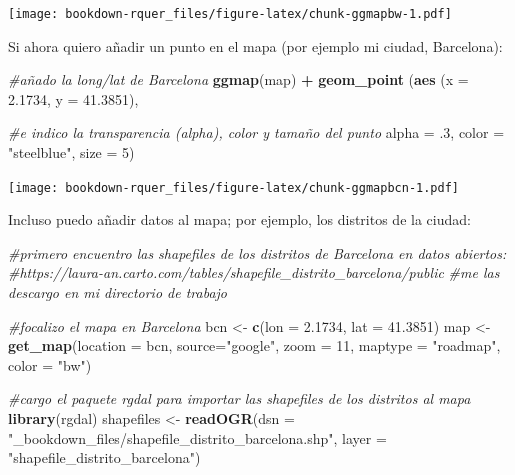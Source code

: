 \documentclass[]{book}
\newenvironment{Shaded}{\begin{snugshade}}{\end{snugshade}}
\newcommand{\CommentTok}[1]{\textcolor[rgb]{0.56,0.35,0.01}{\textit{#1}}}
\newcommand{\DataTypeTok}[1]{\textcolor[rgb]{0.13,0.29,0.53}{#1}}
\newcommand{\DecValTok}[1]{\textcolor[rgb]{0.00,0.00,0.81}{#1}}
\newcommand{\FloatTok}[1]{\textcolor[rgb]{0.00,0.00,0.81}{#1}}
\newcommand{\KeywordTok}[1]{\textcolor[rgb]{0.13,0.29,0.53}{\textbf{#1}}}
\newcommand{\NormalTok}[1]{#1}
\newcommand{\OperatorTok}[1]{\textcolor[rgb]{0.81,0.36,0.00}{\textbf{#1}}}
\newcommand{\StringTok}[1]{\textcolor[rgb]{0.31,0.60,0.02}{#1}}
\theoremstyle{definition}
\theoremstyle{definition}
\theoremstyle{definition}
\theoremstyle{remark}
\begin{document}
\texttt{[image: bookdown-rquer\_files/figure-latex/chunk-ggmapbw-1.pdf]}

Si ahora quiero añadir un punto en el mapa (por ejemplo mi ciudad,
Barcelona):

\begin{Shaded}
\begin{Highlighting}[]
\CommentTok{#añado la long/lat de Barcelona}
\KeywordTok{ggmap}\NormalTok{(map) }\OperatorTok{+}\StringTok{ }\KeywordTok{geom_point}\NormalTok{ (}\KeywordTok{aes}\NormalTok{ (}\DataTypeTok{x =} \FloatTok{2.1734}\NormalTok{, }\DataTypeTok{y =} \FloatTok{41.3851}\NormalTok{),  }
                         
\CommentTok{#e indico la transparencia (alpha), color y tamaño del punto}
\DataTypeTok{alpha =} \FloatTok{.3}\NormalTok{, }\DataTypeTok{color =} \StringTok{"steelblue"}\NormalTok{, }\DataTypeTok{size =} \DecValTok{5}\NormalTok{)}
\end{Highlighting}
\end{Shaded}

\texttt{[image: bookdown-rquer\_files/figure-latex/chunk-ggmapbcn-1.pdf]}

Incluso puedo añadir datos al mapa; por ejemplo, los distritos de la
ciudad:

\begin{Shaded}
\begin{Highlighting}[]
\CommentTok{#primero encuentro las shapefiles de los distritos de Barcelona en datos abiertos:}
\CommentTok{#https://laura-an.carto.com/tables/shapefile_distrito_barcelona/public}
\CommentTok{#me las descargo en mi directorio de trabajo}

\CommentTok{#focalizo el mapa en Barcelona}
\NormalTok{bcn <-}\StringTok{ }\KeywordTok{c}\NormalTok{(}\DataTypeTok{lon =} \FloatTok{2.1734}\NormalTok{, }\DataTypeTok{lat =} \FloatTok{41.3851}\NormalTok{)}
\NormalTok{map <-}\StringTok{ }\KeywordTok{get_map}\NormalTok{(}\DataTypeTok{location =}\NormalTok{ bcn, }\DataTypeTok{source=}\StringTok{"google"}\NormalTok{, }\DataTypeTok{zoom =} \DecValTok{11}\NormalTok{, }\DataTypeTok{maptype =} \StringTok{"roadmap"}\NormalTok{, }\DataTypeTok{color =} \StringTok{"bw"}\NormalTok{)}

\CommentTok{#cargo el paquete rgdal para importar las shapefiles de los distritos al mapa}
\KeywordTok{library}\NormalTok{(rgdal)}
\NormalTok{shapefiles <-}\StringTok{ }\KeywordTok{readOGR}\NormalTok{(}\DataTypeTok{dsn =} \StringTok{"_bookdown_files/shapefile_distrito_barcelona.shp"}\NormalTok{,}
                    \DataTypeTok{layer =} \StringTok{"shapefile_distrito_barcelona"}\NormalTok{) }
\end{Highlighting}
\end{Shaded}
\end{document}
